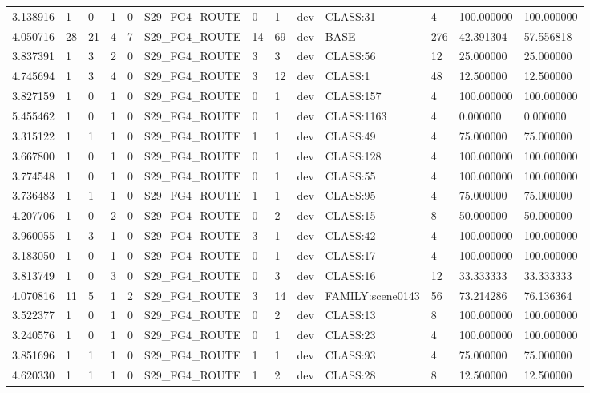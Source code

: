 \begin{tabular}{lllllllllllll}
3.138916 & 1 & 0 & 1 & 0 & S29\_FG4\_ROUTE & 0 & 1 & dev & CLASS:31 & 4 & 100.000000 & 100.000000 \\
4.050716 & 28 & 21 & 4 & 7 & S29\_FG4\_ROUTE & 14 & 69 & dev & BASE & 276 & 42.391304 & 57.556818 \\
3.837391 & 1 & 3 & 2 & 0 & S29\_FG4\_ROUTE & 3 & 3 & dev & CLASS:56 & 12 & 25.000000 & 25.000000 \\
4.745694 & 1 & 3 & 4 & 0 & S29\_FG4\_ROUTE & 3 & 12 & dev & CLASS:1 & 48 & 12.500000 & 12.500000 \\
3.827159 & 1 & 0 & 1 & 0 & S29\_FG4\_ROUTE & 0 & 1 & dev & CLASS:157 & 4 & 100.000000 & 100.000000 \\
5.455462 & 1 & 0 & 1 & 0 & S29\_FG4\_ROUTE & 0 & 1 & dev & CLASS:1163 & 4 & 0.000000 & 0.000000 \\
3.315122 & 1 & 1 & 1 & 0 & S29\_FG4\_ROUTE & 1 & 1 & dev & CLASS:49 & 4 & 75.000000 & 75.000000 \\
3.667800 & 1 & 0 & 1 & 0 & S29\_FG4\_ROUTE & 0 & 1 & dev & CLASS:128 & 4 & 100.000000 & 100.000000 \\
3.774548 & 1 & 0 & 1 & 0 & S29\_FG4\_ROUTE & 0 & 1 & dev & CLASS:55 & 4 & 100.000000 & 100.000000 \\
3.736483 & 1 & 1 & 1 & 0 & S29\_FG4\_ROUTE & 1 & 1 & dev & CLASS:95 & 4 & 75.000000 & 75.000000 \\
4.207706 & 1 & 0 & 2 & 0 & S29\_FG4\_ROUTE & 0 & 2 & dev & CLASS:15 & 8 & 50.000000 & 50.000000 \\
3.960055 & 1 & 3 & 1 & 0 & S29\_FG4\_ROUTE & 3 & 1 & dev & CLASS:42 & 4 & 100.000000 & 100.000000 \\
3.183050 & 1 & 0 & 1 & 0 & S29\_FG4\_ROUTE & 0 & 1 & dev & CLASS:17 & 4 & 100.000000 & 100.000000 \\
3.813749 & 1 & 0 & 3 & 0 & S29\_FG4\_ROUTE & 0 & 3 & dev & CLASS:16 & 12 & 33.333333 & 33.333333 \\
4.070816 & 11 & 5 & 1 & 2 & S29\_FG4\_ROUTE & 3 & 14 & dev & FAMILY:scene0143 & 56 & 73.214286 & 76.136364 \\
3.522377 & 1 & 0 & 1 & 0 & S29\_FG4\_ROUTE & 0 & 2 & dev & CLASS:13 & 8 & 100.000000 & 100.000000 \\
3.240576 & 1 & 0 & 1 & 0 & S29\_FG4\_ROUTE & 0 & 1 & dev & CLASS:23 & 4 & 100.000000 & 100.000000 \\
3.851696 & 1 & 1 & 1 & 0 & S29\_FG4\_ROUTE & 1 & 1 & dev & CLASS:93 & 4 & 75.000000 & 75.000000 \\
4.620330 & 1 & 1 & 1 & 0 & S29\_FG4\_ROUTE & 1 & 2 & dev & CLASS:28 & 8 & 12.500000 & 12.500000 \\

\end{tabular}

